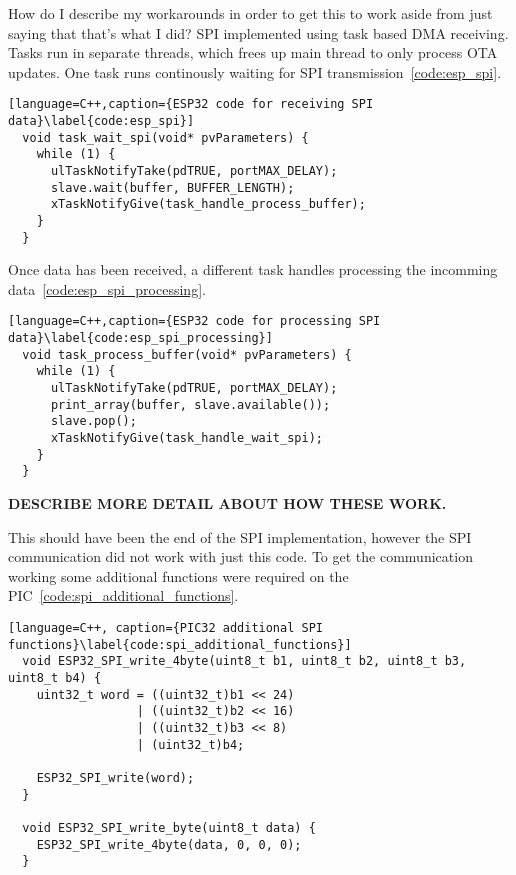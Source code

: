 How do I describe my workarounds in order to get this to work aside from just saying that that's what I did?
SPI implemented using task based DMA receiving.
Tasks run in separate threads, which frees up main thread to only process OTA updates.
One task runs continously waiting for SPI transmission~\autoref{code:esp_spi}.

\begin{lstlisting}[language=C++,caption={ESP32 code for receiving SPI data}\label{code:esp_spi}]
  void task_wait_spi(void* pvParameters) {
    while (1) {
      ulTaskNotifyTake(pdTRUE, portMAX_DELAY);
      slave.wait(buffer, BUFFER_LENGTH);
      xTaskNotifyGive(task_handle_process_buffer);
    }
  }
\end{lstlisting}

Once data has been received, a different task handles processing the incomming data~\autoref{code:esp_spi_processing}.

\begin{lstlisting}[language=C++,caption={ESP32 code for processing SPI data}\label{code:esp_spi_processing}]
  void task_process_buffer(void* pvParameters) {
    while (1) {
      ulTaskNotifyTake(pdTRUE, portMAX_DELAY);
      print_array(buffer, slave.available());
      slave.pop();
      xTaskNotifyGive(task_handle_wait_spi);
    }
  }
\end{lstlisting}

\textbf{DESCRIBE MORE DETAIL ABOUT HOW THESE WORK.}

This should have been the end of the SPI implementation,
however the SPI communication did not work with just this code.
To get the communication working some additional functions were required on the PIC~\autoref{code:spi_additional_functions}.

\begin{lstlisting}[language=C++, caption={PIC32 additional SPI functions}\label{code:spi_additional_functions}]
  void ESP32_SPI_write_4byte(uint8_t b1, uint8_t b2, uint8_t b3, uint8_t b4) {
    uint32_t word = ((uint32_t)b1 << 24)
                  | ((uint32_t)b2 << 16)
                  | ((uint32_t)b3 << 8)
                  | (uint32_t)b4;

    ESP32_SPI_write(word);
  }

  void ESP32_SPI_write_byte(uint8_t data) {
    ESP32_SPI_write_4byte(data, 0, 0, 0);
  }
\end{lstlisting}

